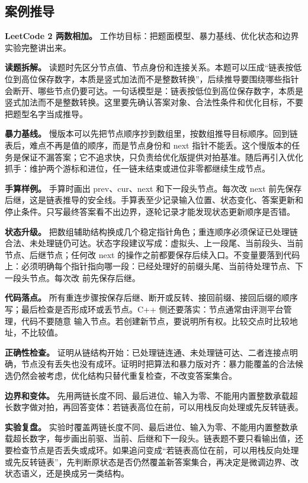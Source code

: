 \subsection{案例推导}

\noindent\textbf{LeetCode 2 两数相加。} 工作坊目标：把题面模型、暴力基线、优化状态和边界实验完整讲出来。

\textbf{读题拆解。} 读题时先区分节点值、节点身份和连接关系。本题可以压成“链表按低位到高位保存数字，本质是竖式加法而不是整数转换”，后续推导要围绕哪些指针会断开、哪些节点仍要可达。一句话模型是：链表按低位到高位保存数字，本质是竖式加法而不是整数转换。这里要先确认答案对象、合法性条件和优化目标，不要把题型名字当成推导。

\textbf{暴力基线。} 慢版本可以先把节点顺序抄到数组里，按数组推导目标顺序。回到链表后，难点不再是值的顺序，而是节点身份和 next 指针不能丢。这个慢版本的任务是保证不漏答案；它不追求快，只负责给优化版提供对拍基准。随后再引入优化抓手：维护两个游标和进位，任一链未结束或进位非零都继续生成节点。

\textbf{手算样例。} 手算时画出 prev、cur、next 和下一段头节点。每次改 next 前先保存后继，这是链表推导的安全线。手算表至少记录输入位置、状态变化、答案更新和停止条件。只写最终答案看不出边界，逐轮记录才能发现状态更新顺序是否错。

\textbf{状态升级。} 把数组辅助结构换成几个稳定指针角色；重连顺序必须保证已处理链合法、未处理链仍可达。状态字段建议写成：虚拟头、上一段尾、当前段头、当前节点、后继节点；任何改 next 的操作之前都要保存后续入口。不变量要落到代码上：必须明确每个指针指向哪一段：已经处理好的前缀头尾、当前待处理节点、下一段头节点。每次改  前先保存后继。

\textbf{代码落点。} 所有重连步骤按保存后继、断开或反转、接回前缀、接回后缀的顺序写；最后检查是否形成环或丢节点。C++ 侧还要落实：节点通常由评测平台管理，代码不要随意  输入节点。若创建新节点，要说明所有权。比较交点时比较地址，不比较值。

\textbf{正确性检查。} 证明从链结构开始：已处理链连通、未处理链可达、二者连接点明确，节点没有丢失也没有成环。证明时把算法和暴力版对齐：暴力能覆盖的合法候选仍然会被考虑，优化结构只替代重复检查，不改变答案集合。

\textbf{边界和变体。} 先用两链长度不同、最后进位、输入为零、不能用内置整数承载超长数字做对拍，再回答变体：若链表高位在前，可以用栈反向处理或先反转链表。

\textbf{实验复盘。} 实验时覆盖两链长度不同、最后进位、输入为零、不能用内置整数承载超长数字，每步画出前驱、当前、后继和下一段头。链表题不要只看输出值，还要检查节点是否丢失或成环。如果追问变成“若链表高位在前，可以用栈反向处理或先反转链表”，先判断原状态是否仍然覆盖新答案集合，再决定是微调边界、改状态语义，还是换成另一类结构。

